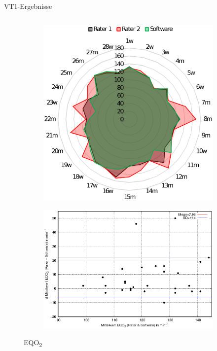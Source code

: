 \documentclass[colorBG,slideColor,8pt]{beamer}
\newcommand{\eqotwo}{EQO\textsubscript{2}}
\begin{document}
\begin{frame}[fragile]{VT1-Ergebnisse}
\begin{columns}
\begin{column}{0.5\linewidth}
\begin{figure}
\begin{subfigure}{0.9\linewidth}
				\includegraphics[width=0.6\linewidth]{Bilder/eqo2_net.eps}
			\end{subfigure}
			\begin{subfigure}{0.9\linewidth}
				\centering
				\includegraphics[width=0.82\linewidth]{Bilder/eqo2.eps}
			\end{subfigure}	
			\caption{\eqotwo}
		\end{figure}
	\end{column}
\end{columns}
\end{frame}
\end{document}
